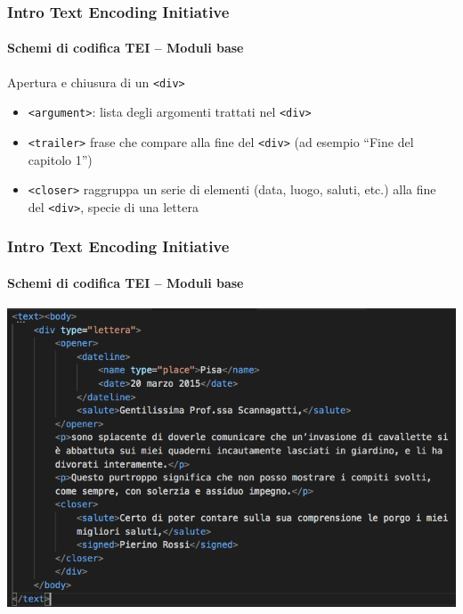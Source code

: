\begin{frame}
	\frametitle{Intro Text Encoding Initiative}
	\framesubtitle{Schemi di codifica TEI – Moduli base}
	\addtocounter{nframe}{1}

	\begin{block}{Apertura e chiusura di un \texttt{<div>}}
        \begin{itemize}
            \item \texttt{<argument>}: lista degli argomenti trattati nel \texttt{<div>}
            \item \texttt{<trailer>} frase che compare alla fine del \texttt{<div>} (ad esempio ``Fine del capitolo 1'')
            \item \texttt{<closer>} raggruppa un serie di elementi (data, luogo, saluti, etc.) alla fine del \texttt{<div>}, specie di una lettera
        \end{itemize}
    \end{block}

\end{frame}


\begin{frame}
	\frametitle{Intro Text Encoding Initiative}
	\framesubtitle{Schemi di codifica TEI – Moduli base}
	\addtocounter{nframe}{1}        
	   
	\begin{center}
		\includegraphics[width=.9\textwidth]{imgs/esLettera.png}
	\end{center}


\end{frame}





